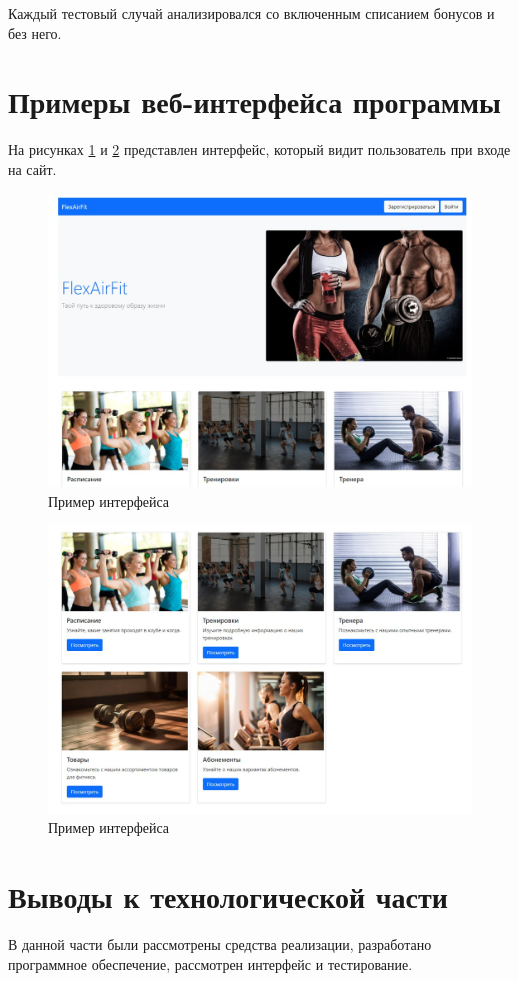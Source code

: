 Каждый тестовый случай анализировался со включенным списанием бонусов и без него.


\section{Примеры веб-интерфейса программы}

На рисунках \ref{fig:pr1} и \ref{fig:pr2} представлен интерфейс, который видит пользователь при входе на сайт.


\begin{figure}[h!]
	\centering
	\includegraphics[width=\linewidth]{img/pr1}
	\caption{Пример интерфейса}
	\label{fig:pr1}
\end{figure}

\begin{figure}[h!]
	\centering
	\includegraphics[width=\linewidth]{img/pr2}
	\caption{Пример интерфейса}
	\label{fig:pr2}
\end{figure}
\clearpage

\section{Выводы к технологической части}

В данной части были рассмотрены средства реализации, разработано программное обеспечение, рассмотрен интерфейс и тестирование.
